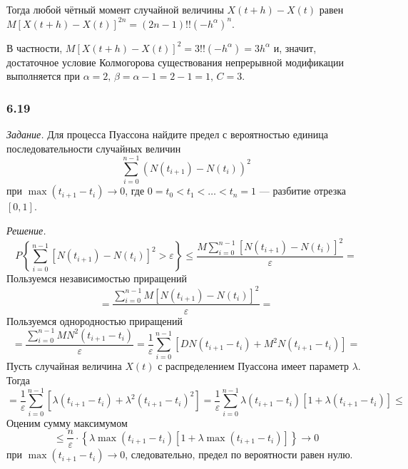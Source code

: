 \begin{enumerate}[label=\alph*)]
  Тогда любой чётный момент случайной величины $X \left( t + h \right) - X \left( t \right) $ равен
  $M \left[ X \left( t + h \right) - X \left( t \right) \right]^{2n} =
    \left( 2n - 1 \right)!! \left( -h^{ \alpha } \right)^n$.

  В частности,
  $M \left[ X \left( t + h \right) - X \left( t \right) \right]^2 =
    3!! \left( -h^{ \alpha } \right) =
    3h^{ \alpha }$
  и, значит, достаточное условие Колмогорова существования непрерывной модификации выполняется при
  $ \alpha = 2, \,
    \beta = \alpha - 1 = 2 - 1 = 1, \,
    C = 3$.
\end{enumerate}

\subsubsection*{6.19}

\textit{Задание.}
Для процесса Пуассона найдите предел с вероятностью единица последовательности случайных величин
$$ \sum \limits_{i = 0}^{n - 1} \left( N \left( t_{i + 1} \right) - N \left( t_i \right) \right)^2$$
при $ \max \left( t_{i + 1} - t_i \right) \to 0$, где $0 = t_0 < t_1 < \dotsc < t_n = 1$ ---
разбитие отрезка $ \left[ 0, 1 \right] $.

\textit{Решение.}
$$P \left\{
    \sum \limits_{i = 0}^{n - 1} \left[ N \left( t_{i + 1} \right) - N \left( t_i \right) \right]^2 >
    \varepsilon \right\} \leq
  \frac{M\sum\limits_{i=0}^{n-1}\left[N\left(t_{i+1}\right)-N\left(t_i\right)\right]^2}{\varepsilon} =$$
Пользуемся независимостью приращений
$$=\frac{\sum\limits_{i=0}^{n-1}M\left[N\left(t_{i+1}\right)-N\left(t_i\right)\right]^2}{\varepsilon} =$$
Пользуемся однородностью приращений
$$= \frac{ \sum \limits_{i = 0}^{n - 1} MN^2 \left( t_{i + 1} - t_i \right) }{ \varepsilon } =
  \frac{1}{ \varepsilon }
  \sum \limits_{i = 0}^{n - 1}
    \left[ DN \left( t_{i + 1} - t_i \right) + M^2 N \left( t_{i + 1} - t_i \right) \right] =$$
Пусть случайная величина $X \left( t \right) $ с распределением Пуассона имеет параметр $ \lambda $.
Тогда
$$= \frac{1}{ \varepsilon }
  \sum \limits_{i = 0}^{n - 1} \left[
  \lambda \left( t_{i + 1} - t_i \right) + \lambda^2 \left( t_{i + 1} - t_i \right)^2 \right] =
  \frac{1}{ \varepsilon }
  \sum \limits_{i = 0}^{n - 1}
    \lambda \left( t_{i + 1} - t_i \right)
    \left[ 1 + \lambda \left( t_{i + 1} - t_i \right) \right] \leq$$
Оценим сумму максимумом
$$\leq \frac{n}{ \varepsilon } \cdot \left\{
    \lambda \max \left( t_{i + 1} - t_i \right)
    \left[ 1 + \lambda \max \left( t_{i + 1} - t_i \right) \right] \right\} \to
  0$$
при $ \max \left( t_{i + 1} - t_i \right) \to 0$, следовательно, предел по вероятности равен нулю.
